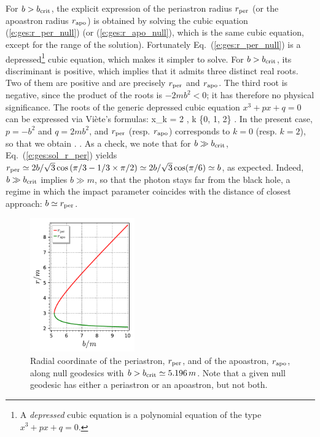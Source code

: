 For $b > b_{\rm crit}$, the explicit expression of the periastron radius
$r_{\rm per}$ (or the apoastron radius $r_{\rm apo}$)
is obtained by solving the cubic equation (\ref{e:ges:r_per_null})
(or (\ref{e:ges:r_apo_null}), which is the same cubic equation, except for
the range of the solution). Fortunately Eq.~(\ref{e:ges:r_per_null})
is a depressed\footnote{A \emph{depressed} cubic equation is a polynomial equation
of the type $x^3 + p x + q = 0$.} cubic equation, which makes
it simpler to solve. For $b > b_{\rm crit}$, its discriminant is positive, which
implies that it admits three distinct real roots. Two of them are positive
and are precisely $r_{\rm per}$ and $r_{\rm apo}$. The third root is negative,
since the product of the roots is $-2mb^2 < 0$; it has therefore no
physical significance. The roots of the generic depressed cubic
equation $x^3 + p x + q = 0$ can be expressed via Viète's formulas:
\be \label{e:gis:Viete}
    x_k = 2  \cos {},
        \qquad k \in \{0, 1, 2\} .
\ee
In the present case, $p= - b^2$ and $q = 2 m b^2$,
and $r_{\rm per}$ (resp. $r_{\rm apo}$) corresponds to $k=0$
(resp. $k=2$), so that we obtain
\be \label{e:ges:sol_r_per}
  .
\ee
\be \label{e:ges:sol_r_apo}
   .
\ee
As a check, we note that for $b\gg b_{\rm crit}$, Eq.~(\ref{e:ges:sol_r_per})
yields $r_{\rm per} \simeq 2b/\sqrt{3} \cos\left(\pi/3 -1/3 \times \pi/2 \right)
\simeq 2b/\sqrt{3} \cos(\pi/6) \simeq b$, as expected. Indeed, $b\gg b_{\rm crit}$
implies $b \gg m$, so that the photon stays far from the black hole, a regime
in which the impact parameter coincides with the distance of closest approach:
$b \simeq r_{\rm per}$.

\begin{figure}
\centerline{\includegraphics[width=0.4\textwidth]{ges_null_per_apo.pdf}}
\caption[]{\label{f:gis:null_per_apo} \footnotesize
Radial coordinate of the periastron, $r_{\rm per}$, and of the apoastron,
$r_{\rm apo}$, along null geodesics with $b > b_{\rm crit} \simeq 5.196\, m$.
Note that a given null geodesic has either a periastron or an apoastron, but not
both.}
\end{figure}

